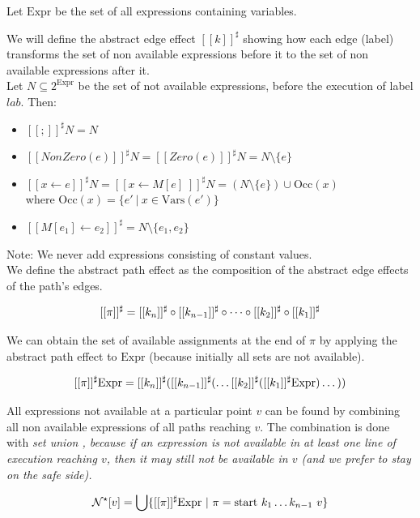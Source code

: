 \documentclass[a4paper]{article}
\def\definition{Definition:\ }
\def\la{\leftarrow}
\def\vars{\mathrm{Vars}}
\def\occ{\mathrm{Occ}}
\begin{document}
\begin{enumerate}

  Let $ \mathrm{Expr} $ be the set of all expressions containing variables.

  We will define the abstract edge effect $ [[k]]^\sharp $ showing how each
  edge (label) transforms the set of non available expressions before it to the
  set of non available expressions after it. \\
  Let $ N \subseteq 2^{\mathrm{Expr}} $ be the set of not available
  expressions, before the execution of label $ lab $. Then:
  \begin{itemize}
    \item $ [[;]]^\sharp N = N $
    \item $ [[NonZero(e)]]^\sharp N = [[Zero(e)]]^\sharp N = N \setminus \{ e \} $
    \item $ [[x \la e]]^\sharp N = [[x \la M[e]\;]]^\sharp N = (N \setminus \{ e \}) \cup \occ(x) $ \\ where $ \occ(x) = \{ e'\ |\ x \in \vars(e') \} $
    \item $ [[M[e_1] \la e_2]]^\sharp = N \setminus \{ e_1, e_2 \} $
  \end{itemize}
  Note: We never add expressions consisting of constant values. \\
  
  We define the abstract path effect as the composition of the abstract edge
  effects of the path's edges.

  $$ [[\pi]]^\sharp = [[k_n]]^\sharp \circ [[k_{n-1}]]^\sharp \circ \dots \circ [[k_2]]^\sharp \circ [[k_1]]^\sharp $$

  We can obtain the set of available assignments at the end of $ \pi $ by
  applying the abstract path effect to $ \mathrm{Expr} $ (because initially all
  sets are not available).

  $$ [[\pi]]^\sharp \mathrm{Expr} = [[k_n]]^\sharp([[k_{n-1}]]^\sharp(\dots[[k_2]]^\sharp([[k_1]]^\sharp \mathrm{Expr})\dots)) $$

  All expressions not available at a particular point $ v $ can be found by
  combining all non available expressions of all paths reaching $ v $. The
  combination is done with \em set union \em, because if an expression is not
  available in at least one line of execution reaching $ v $, then it may still
  not be available in $ v $ (and we prefer to stay on the safe side).

  $$ \mathcal{N}^\star[v] = \bigcup \{ [[\pi]]^\sharp \mathrm{Expr} \ |\ \pi = \mbox{start } k_1 \dots k_{n-1}\ v \} $$


\end{enumerate}
\end{document}
